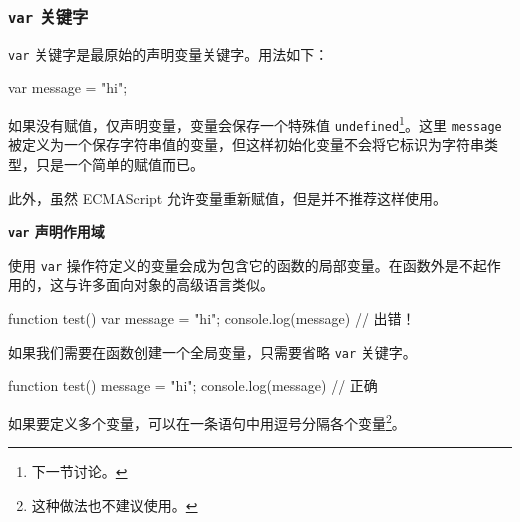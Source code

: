 \subsubsection{\texttt{var} 关键字}

\texttt{var} 关键字是最原始的声明变量关键字。用法如下：

\begin{JavaScript}
var message = "hi";
\end{JavaScript}

如果没有赋值，仅声明变量，变量会保存一个特殊值 \texttt{undefined}\footnote{下一节讨论。}。这里 \texttt{message} 被定义为一个保存字符串值的变量，但这样初始化变量不会将它标识为字符串类型，只是一个简单的赋值而已。

此外，虽然 ECMAScript 允许变量重新赋值，但是并不推荐这样使用。

\noindent\textbf{\texttt{var} 声明作用域}

使用 \texttt{var} 操作符定义的变量会成为包含它的函数的局部变量。在函数外是不起作用的，这与许多面向对象的高级语言类似。

\begin{JavaScript}
function test() {
    var message = "hi";
}
console.log(message)    // 出错！
\end{JavaScript}

如果我们需要在函数创建一个全局变量，只需要省略 \texttt{var} 关键字。

\begin{JavaScript}
function test() {
    message = "hi";
}
console.log(message)    // 正确
\end{JavaScript}


如果要定义多个变量，可以在一条语句中用逗号分隔各个变量\footnote{这种做法也不建议使用。}。